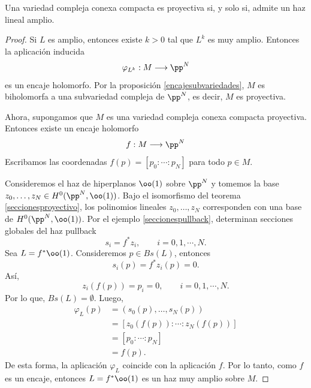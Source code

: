 	\begin{theorem}\label{proyectivossiamplio}
		Una variedad compleja conexa compacta es proyectiva si, y solo si, admite un haz lineal amplio.
	\end{theorem}
	\begin{proof}
		Si $L$ es amplio, entonces existe $k>0$ tal que $L^k$ es muy amplio. Entonces la aplicación inducida 
		\begin{equation*}
			\varphi_{L^k}:M\longrightarrow \pp^N
		\end{equation*}
		es un encaje holomorfo. Por la proposición \ref{encajesubvariedades}, $M$ es biholomorfa a una subvariedad compleja de $\pp^N$, es decir, $M$ es proyectiva.
		
		
		Ahora, supongamos que $M$ es una variedad compleja conexa compacta proyectiva. Entonces existe un encaje holomorfo
		\begin{equation*}
			f:M\longrightarrow\pp^N
		\end{equation*}
		Escribamos las coordenadas $f(p)=[p_0:\cdots:p_N]$ para todo $p\in M$.
		
		Consideremos el haz de hiperplanos $\oo(1)$ sobre $\pp^N$ y tomemos la base $z_0,\dots,z_N\in H^0(\pp^N,\oo(1))$. Bajo el isomorfismo del teorema \ref{seccionesproyectivo}, los polinomios lineales $z_0,\dots,z_N$ corresponden con una base de $H^0(\pp^N,\oo(1))$. Por el ejemplo \ref{seccionespullback}, determinan secciones globales del haz pullback
		\begin{equation*}
			s_i=f^*z_i,\qquad i=0,1,\cdots, N.
		\end{equation*}
		Sea $L=f^*\oo(1)$. Consideremos $p\in Bs(L)$, entonces
		\begin{equation*}
			s_i(p)=f^*z_i(p)=0.
		\end{equation*}
		Así,
		\begin{equation*}
			z_i(f(p))=p_i=0,\qquad i=0,1,\cdots, N.
		\end{equation*}
		Por lo que, $Bs(L)=\emptyset$. Luego, 
		\begin{align*}
			\varphi_L(p)&=(s_0(p),\dots,s_N(p))\\
			&=[z_0(f(p)):\cdots:z_N(f(p))]\\
			&=[p_0:\cdots:p_N]\\
			&=f(p).
		\end{align*}
		De esta forma, la aplicación $\varphi_L$ coincide con la aplicación $f$. Por lo tanto, como $f$ es un encaje, entonces $L=f^*\oo(1)$ es un haz muy amplio sobre $M$.
	\end{proof}
    

